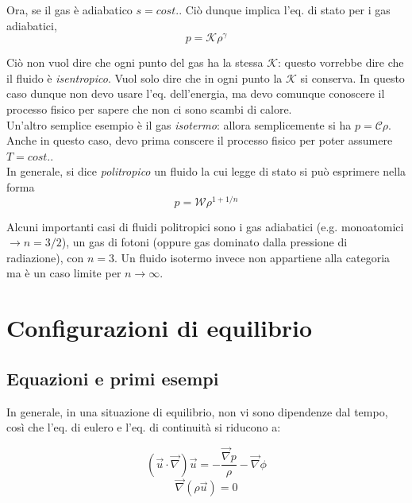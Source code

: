 \documentclass{report}
\begin{document}
Ora, se il gas è adiabatico $s = cost.$. Ciò dunque implica l'eq. di stato per i gas adiabatici, 
\begin{equation}
    p = \mathcal{K}\rho^\gamma
\end{equation}

Ciò non vuol dire che ogni punto del gas ha la stessa $\mathcal{K}$: questo vorrebbe dire che il fluido è \emph{isentropico}. Vuol solo dire che in ogni punto la $\mathcal{K}$ si conserva. In questo caso dunque non devo usare l'eq. dell'energia, ma devo comunque conoscere il processo fisico per sapere che non ci sono scambi di calore. \\

Un'altro semplice esempio è il gas \emph{isotermo}: allora semplicemente si ha $p = \mathcal{C}\rho$. Anche in questo caso, devo prima conscere il processo fisico per poter assumere $T = cost.$. \\

In generale, si dice \emph{politropico} un fluido la cui legge di stato si può esprimere nella forma 
\begin{equation}
    p = \mathcal{W}\rho^{1 + 1/n}
\end{equation}

Alcuni importanti casi di fluidi politropici sono i gas adiabatici (e.g. monoatomici $\rightarrow n= 3/2$), un gas di fotoni (oppure gas dominato dalla pressione di radiazione), con $n = 3$. Un fluido isotermo invece non appartiene alla categoria ma è un caso limite per $n \rightarrow \infty$. 

\newpage

\chapter{Configurazioni di equilibrio}


\section{Equazioni e primi esempi}

In generale, in una situazione di equilibrio, non vi sono dipendenze dal tempo, così che l'eq. di eulero e l'eq. di continuità si riducono a: 

\begin{equation}
     (\vec{u}\cdot \vec{\nabla})\vec{u} = -\frac{\vec{\nabla}p}{\rho} - \vec{\nabla}\phi
\end{equation}
\begin{equation}
    \vec{\nabla}(\rho \vec{u}) = 0
\end{equation}
\end{document}
